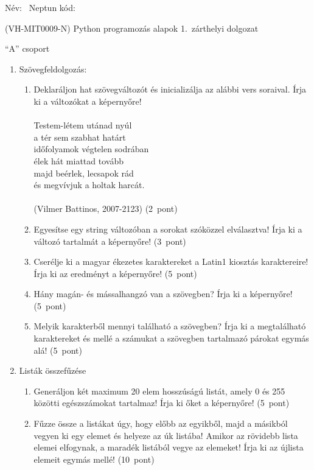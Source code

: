 \documentclass[a4paper,12pt]{letter}
\begin{document}

Név: \hrulefill\ Neptun kód: \hrulefill

\begin{center}
 (VH-MIT0009-N) Python programozás alapok 1.~zárthelyi dolgozat

 ``A'' csoport
 \end{center}

 \begin{enumerate}
 \item Szövegfeldolgozás:
   \begin{enumerate}
   \item Deklaráljon hat szövegváltozót és inicializálja az alábbi vers soraival. Írja ki a változókat a képernyőre! \\ \\Testem-létem utánad nyúl\\a tér sem szabhat határt\\időfolyamok végtelen sodrában\\élek hát miattad tovább\\majd beérlek, lecsapok rád\\és megvívjuk a holtak harcát.\\ \\(Vilmer Battinos, 2007-2123) \hfill (2~pont)
   \item Egyesítse egy string változóban a sorokat szóközzel elválasztva! Írja ki a változó tartalmát a képernyőre! \hfill (3~pont)
   \item Cserélje ki a magyar ékezetes karaktereket a Latin1 kiosztás karaktereire! Írja ki az eredményt a képernyőre! \hfill (5~pont)
   \item Hány magán- és mássalhangzó van a szövegben? Írja ki a képernyőre! \hfill (5~pont)
   \item Melyik karakterből mennyi található a szövegben? Írja ki a megtalálható karaktereket és mellé a számukat a szövegben tartalmazó párokat egymás alá! \hfill (5~pont)
   \end{enumerate}
 \item Listák összefűzése
\begin{enumerate}
   \item Generáljon két maximum 20 elem hosszúságú listát, amely 0 és 255 közötti egészszámokat tartalmaz! Írja ki őket a képernyőre!  \hfill (5~pont)
     \item Fűzze össze a listákat úgy, hogy előbb az egyikből, majd a másikból vegyen ki egy elemet és helyeze az úk listába! Amikor az rövidebb lista elemei elfogynak, a maradék listából vegye az elemeket! Írja ki az újlista elemeit egymás mellé! \hfill (10~pont)

\end{enumerate}
\end{enumerate}
\end{document}
